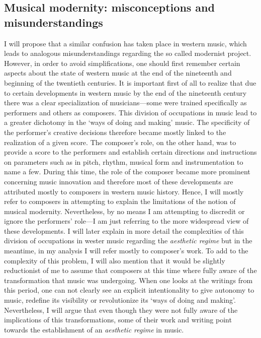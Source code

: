 \subsection{Musical modernity: misconceptions and misunderstandings}

I will propose that a similar confusion has taken place in western music, which leads to analogous misunderstandings regarding the so called modernist project. However, in order to avoid simplifications, one should first remember certain aspects about the state of western music at the end of the nineteenth and beginning of the twentieth centuries. It is important first of all to realize that due to certain developments in western music by the end of the nineteenth century there was a clear specialization of musicians---some were trained specifically as performers and others as composers. This division of occupations in music lead to a greater dichotomy in the `ways of doing and making' music. The specificity of the performer's creative decisions therefore became mostly linked to the realization of a given score. The composer's role, on the other hand, was to provide a score to the performers and establish certain directions and instructions on parameters such as in pitch, rhythm, musical form and instrumentation to name a few. During this time, the role of the composer became more prominent concerning music innovation and therefore most of these developments are attributed mostly to composers in western music history. Hence, I will mostly refer to composers in attempting to explain the limitations of the notion of musical modernity. Nevertheless, by no means I am attempting to discredit or ignore the performers' role---I am just referring to the more widespread view of these developments. I will later explain in more detail the complexities of this division of occupations in wester music regarding the \emph{aesthetic regime} but in the meantime, in my analysis I will refer mostly to composer's work. To add to the complexity of this problem, I will also mention that it would be slightly reductionist of me to assume that composers at this time where fully aware of the transformation that music was undergoing. When one looks at the writings from this period, one can not clearly see an explicit intentionality to give autonomy to music, redefine its visibility or revolutionize its `ways of doing and making'. Nevertheless, I will argue that even though they were not fully aware of the implications of this transformations, some of their work and writing point towards the establishment of an \emph{aesthetic regime} in music.

